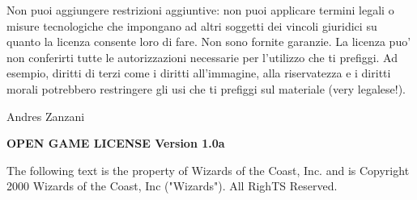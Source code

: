 \documentclass[a4paper,11pt,twoside,openany]{dndbook}
\begin{document}
{\bigskip
Non puoi aggiungere restrizioni aggiuntive: non puoi applicare termini legali o misure tecnologiche che impongano ad altri soggetti dei vincoli giuridici su quanto la licenza consente loro di fare. Non sono fornite garanzie. La licenza puo' non conferirti tutte le autorizzazioni necessarie per l'utilizzo che ti prefiggi. Ad esempio, diritti di terzi come i diritti all'immagine, alla riservatezza e i diritti morali potrebbero restringere gli usi che ti prefiggi sul materiale (very legalese!).

\bigskip

Andres Zanzani

\pagebreak

{\small 
\textbf{OPEN GAME LICENSE Version 1.0a}

The following text is the property of Wizards of the Coast, Inc. and is Copyright 2000 Wizards of the Coast, Inc ("Wizards"). All RighTS Reserved.

}}
\end{document}
